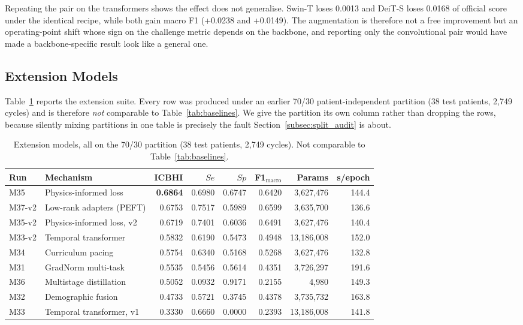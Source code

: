 \documentclass[journal,onecolumn]{IEEEtran}
\newcommand{\best}[1]{\textbf{#1}}
\begin{document}
Repeating the pair on the transformers shows the effect does not generalise. Swin-T
loses 0.0013 and DeiT-S loses 0.0168 of official score under the identical recipe, while
both gain macro F1 (+0.0238 and +0.0149). The augmentation is therefore not a free
improvement but an operating-point shift whose sign on the challenge metric depends on
the backbone, and reporting only the convolutional pair would have made a
backbone-specific result look like a general one.

\subsection{Extension Models}
\label{subsec:novelty}

Table~\ref{tab:novelty} reports the extension suite. Every row was produced under an
earlier 70/30 patient-independent partition (38 test patients, 2{,}749 cycles) and is
therefore \emph{not} comparable to Table~\ref{tab:baselines}. We give the partition
its own column rather than dropping the rows, because silently mixing partitions in
one table is precisely the fault Section~\ref{subsec:split_audit} is about.

\begin{table}[!t]
\centering
\caption{Extension models, all on the 70/30 partition (38 test patients, 2{,}749
cycles). Not comparable to Table~\ref{tab:baselines}.}
\label{tab:novelty}
\begin{tabular}{llrrrrrr}
\toprule
Run & Mechanism & ICBHI & $Se$ & $Sp$ & F1$_{\text{macro}}$ & Params & s/epoch \\
\midrule
M35    & Physics-informed loss      & \best{0.6864} & 0.6980 & 0.6747 & 0.6420 & 3{,}627{,}476  & 144.4 \\
M37-v2 & Low-rank adapters (PEFT)   & 0.6753 & 0.7517 & 0.5989 & 0.6599 & 3{,}635{,}700  & 136.6 \\
M35-v2 & Physics-informed loss, v2  & 0.6719 & 0.7401 & 0.6036 & 0.6491 & 3{,}627{,}476  & 140.4 \\
M33-v2 & Temporal transformer       & 0.5832 & 0.6190 & 0.5473 & 0.4948 & 13{,}186{,}008 & 152.0 \\
M34    & Curriculum pacing          & 0.5754 & 0.6340 & 0.5168 & 0.5268 & 3{,}627{,}476  & 132.8 \\
M31    & GradNorm multi-task        & 0.5535 & 0.5456 & 0.5614 & 0.4351 & 3{,}726{,}297  & 191.6 \\
M36    & Multistage distillation    & 0.5052 & 0.0932 & 0.9171 & 0.2155 & 4{,}980        & 149.3 \\
M32    & Demographic fusion         & 0.4733 & 0.5721 & 0.3745 & 0.4378 & 3{,}735{,}732  & 163.8 \\
M33    & Temporal transformer, v1   & 0.3330 & 0.6660 & 0.0000 & 0.2393 & 13{,}186{,}008 & 141.8 \\
\bottomrule
\end{tabular}
\end{table}
\end{document}
